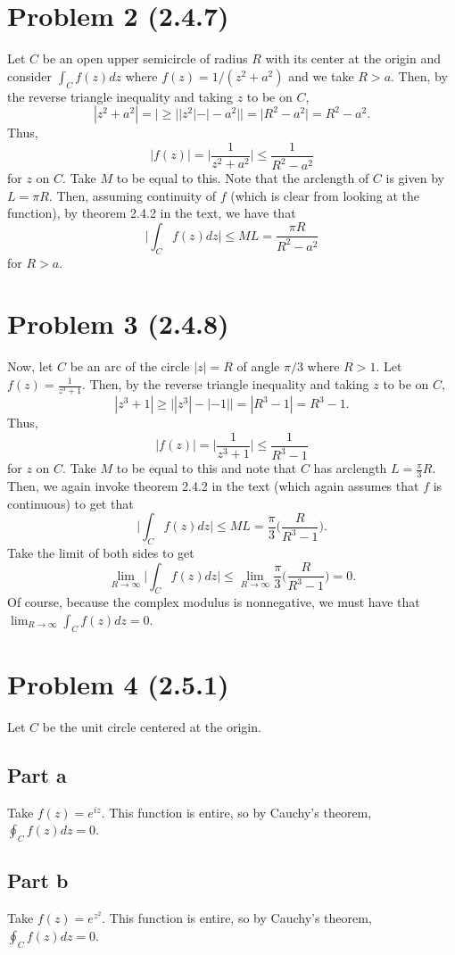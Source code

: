 \documentclass{article}
\begin{document}
\section{Problem 2 (2.4.7)} 
Let $C$ be an open upper semicircle of radius $R$ with its center at the origin and consider $\int_C f(z)dz$ where $f(z)=1/(z^2+a^2)$ and we take $R>a$. Then, by the reverse triangle inequality and taking $z$ to be on $C$, 
\[
|z^2+a^2|=|\geq\big||z^2|-|-a^2|\big|=|R^2-a^2|=R^2-a^2.
\]
Thus,
\[
|f(z)|=\bigg|\frac{1}{z^2+a^2}\bigg|\leq\frac{1}{R^2-a^2}
\]
for $z$ on $C$. Take $M$ to be equal to this. Note that the arclength of $C$ is given by $L=\pi R$. Then, assuming continuity of $f$ (which is clear from looking at the function), by theorem 2.4.2 in the text, we have that 
\[
\bigg|\int_C f(z)dz\bigg|\leq ML=\frac{\pi R}{R^2-a^2}
\]
for $R>a$. 

\section{Problem 3 (2.4.8)}
Now, let $C$ be an arc of the circle $|z|=R$ of angle $\pi/3$ where $R>1$. Let $f(z)=\frac{1}{z^3+1}$. Then, by the reverse triangle inequality and taking $z$ to be on $C$, 
\[
|z^3+1|\geq\big||z^3|-|-1|\big|=|R^3-1|=R^3-1.
\]
Thus, 
\[
|f(z)|=\bigg|\frac{1}{z^3+1}\bigg|\leq\frac{1}{R^3-1}
\]
for $z$ on $C$. Take $M$ to be equal to this and note that $C$ has arclength $L=\frac{\pi}{3}R$. Then, we again invoke theorem 2.4.2 in the text (which again assumes that $f$ is continuous) to get that 
\[
\bigg|\int_C f(z)dz\bigg|\leq ML=\frac{\pi}{3}\bigg(\frac{R}{R^3-1}\bigg).
\]
Take the limit of both sides to get 
\[
\lim_{R\to\infty}\bigg|\int_C f(z)dz\bigg|\leq\lim_{R\to\infty}\frac{\pi}{3}\bigg(\frac{R}{R^3-1}\bigg)=0.
\]
Of course, because the complex modulus is nonnegative, we must have that $\lim_{R\to\infty}\int_C f(z)dz=0$.

\section{Problem 4 (2.5.1)}
Let $C$ be the unit circle centered at the origin.
\subsection{Part a}
Take $f(z)=e^{iz}$. This function is entire, so by Cauchy's theorem, $\oint_C f(z)dz=0$.
\subsection{Part b}
Take $f(z)=e^{z^2}$. This function is entire, so by Cauchy's theorem, $\oint_C f(z)dz=0$.
\end{document}
